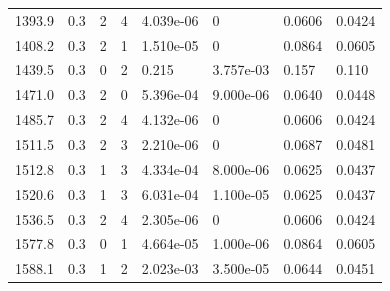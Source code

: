\documentclass[preview]{standalone}
\begin{document}
{{{\begin{tabular}{L{1.2cm}C{1.2cm} C{0.3cm}C{0.5cm} C{1.4cm}C{1.4cm} C{1.4cm}C{1.4cm}}
  1393.9  &   0.3  & 2     &  4 &  4.039e-06  & 0  & 0.0606 &  0.0424   \\ 
  1408.2  &   0.3  & 2     &  1 &  1.510e-05  & 0  & 0.0864 &  0.0605   \\ 
  1439.5  &   0.3  & 0     &  2 &  0.215  & 3.757e-03  & 0.157 &  0.110   \\ 
  1471.0  &   0.3  & 2     &  0 &  5.396e-04  & 9.000e-06  & 0.0640 &  0.0448   \\ 
  1485.7  &   0.3  & 2     &  4 &  4.132e-06  & 0  & 0.0606 &  0.0424   \\ 
  1511.5  &   0.3  & 2     &  3 &  2.210e-06  & 0  & 0.0687 &  0.0481   \\ 
  1512.8  &   0.3  & 1     &  3 &  4.334e-04  & 8.000e-06  & 0.0625 &  0.0437   \\ 
  1520.6  &   0.3  & 1     &  3 &  6.031e-04  & 1.100e-05  & 0.0625 &  0.0437   \\ 
  1536.5  &   0.3  & 2     &  4 &  2.305e-06  & 0  & 0.0606 &  0.0424   \\ 
  1577.8  &   0.3  & 0     &  1 &  4.664e-05  & 1.000e-06  & 0.0864 &  0.0605   \\ 
  1588.1  &   0.3  & 1     &  2 &  2.023e-03  & 3.500e-05  & 0.0644 &  0.0451   \\ 
\hline 
\end{tabular} 

}}}
\end{document}
